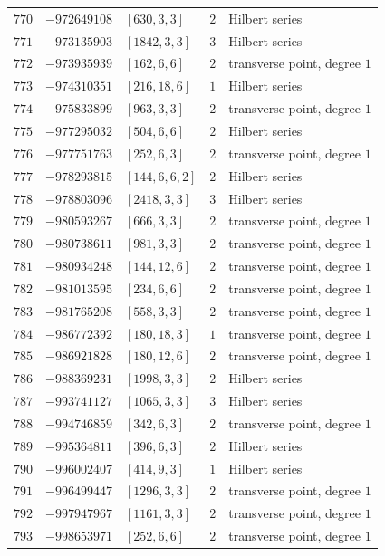 \documentclass[11pt]{article}
\begin{document}
\begin{center}
\begin{longtable}{r r l c l}
$770$ & $-972649108$ & $[630,3,3]$ & $2$ & Hilbert series\\
$771$ & $-973135903$ & $[1842,3,3]$ & $3$ & Hilbert series\\
$772$ & $-973935939$ & $[162,6,6]$ & $2$ & transverse point, degree $1$\\
$773$ & $-974310351$ & $[216,18,6]$ & $1$ & Hilbert series\\
$774$ & $-975833899$ & $[963,3,3]$ & $2$ & transverse point, degree $1$\\
$775$ & $-977295032$ & $[504,6,6]$ & $2$ & Hilbert series\\
$776$ & $-977751763$ & $[252,6,3]$ & $2$ & transverse point, degree $1$\\
$777$ & $-978293815$ & $[144,6,6,2]$ & $2$ & Hilbert series\\
$778$ & $-978803096$ & $[2418,3,3]$ & $3$ & Hilbert series\\
$779$ & $-980593267$ & $[666,3,3]$ & $2$ & transverse point, degree $1$\\
$780$ & $-980738611$ & $[981,3,3]$ & $2$ & transverse point, degree $1$\\
$781$ & $-980934248$ & $[144,12,6]$ & $2$ & transverse point, degree $1$\\
$782$ & $-981013595$ & $[234,6,6]$ & $2$ & transverse point, degree $1$\\
$783$ & $-981765208$ & $[558,3,3]$ & $2$ & transverse point, degree $1$\\
$784$ & $-986772392$ & $[180,18,3]$ & $1$ & transverse point, degree $1$\\
$785$ & $-986921828$ & $[180,12,6]$ & $2$ & transverse point, degree $1$\\
$786$ & $-988369231$ & $[1998,3,3]$ & $2$ & Hilbert series\\
$787$ & $-993741127$ & $[1065,3,3]$ & $3$ & Hilbert series\\
$788$ & $-994746859$ & $[342,6,3]$ & $2$ & transverse point, degree $1$\\
$789$ & $-995364811$ & $[396,6,3]$ & $2$ & Hilbert series\\
$790$ & $-996002407$ & $[414,9,3]$ & $1$ & Hilbert series\\
$791$ & $-996499447$ & $[1296,3,3]$ & $2$ & transverse point, degree $1$\\
$792$ & $-997947967$ & $[1161,3,3]$ & $2$ & transverse point, degree $1$\\
$793$ & $-998653971$ & $[252,6,6]$ & $2$ & transverse point, degree $1$\\

\end{longtable}
\end{center}
\end{document}
